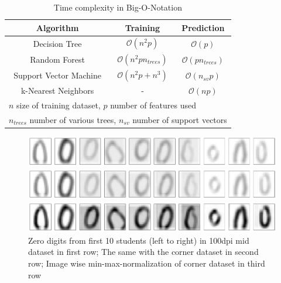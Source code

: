 \documentclass[conference]{IEEEtran}
\begin{document}
\begin{table}[htbp]
    \color{til}
    \caption{\color{til}Time complexity in Big-O-Notation}
    \begin{center}
    \begin{tabular}{|c|c|c|}
        \hline
        \textbf{Algorithm} & \textbf{Training} & \textbf{Prediction} \\
        \hline
        Decision Tree & $\mathcal{O}(n^2p)$ & $\mathcal{O}(p)$ \\
        \hline
        Random Forest & $\mathcal{O}(n^2pn_{trees})$ & $\mathcal{O}(pn_{trees})$ \\
        \hline
        Support Vector Machine & $\mathcal{O}(n^2p+n^3)$ & $\mathcal{O}(n_{sv}p)$ \\
        \hline
        k-Nearest Neighbors & - & $\mathcal{O}(np)$ \\
        \hline
        \multicolumn{3}{l}{$n$ size of training dataset, $p$ number of features used } \\
        \multicolumn{3}{l}{$n_{trees}$ number of various trees, $n_{sv}$ number of support vectors } \\
    \end{tabular}
    \label{table:timeComplexity}
    \end{center}
\end{table}

\begin{figure}[htbp]
    \centerline{\includegraphics[width=1.0\linewidth]{preprocessing/mid_withoutNorm.pdf}}
    \centerline{\includegraphics[width=1.0\linewidth]{preprocessing/corner_withoutNorm.pdf}}
    \centerline{\includegraphics[width=1.0\linewidth]{preprocessing/corner_withNorm.pdf}}
    \caption{\color{til}Zero digits from first 10 students (left to right) in 100dpi mid dataset in first row; The same with the corner dataset in second row; Image wise min-max-normalization of corner dataset in third row}
    \label{fig:dataset}
\end{figure}
\end{document}
